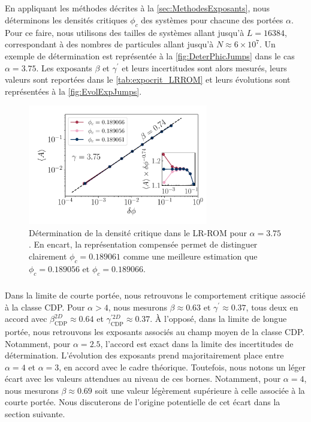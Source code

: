 \subparagraph{}En appliquant les méthodes décrites à la \autoref{sec:MethodesExposants}, nous déterminons les densités critiques $\phi_c$ des systèmes pour chacune des portées $\alpha$. Pour ce faire, nous utilisons des tailles de systèmes allant jusqu'à $L=16384$, correspondant à des nombres de particules allant jusqu'à $N\approx 6\times 10^7$. Un exemple de détermination est représentée à la \autoref{fig:DeterPhicJumps} dans le cas $\alpha = 3.75$. Les exposants $\beta$ et $\gamma^\prime$ et leurs incertitudes sont alors mesurés, leurs valeurs sont reportées dans le \autoref{tab:expocrit_LRROM} et leurs évolutions sont représentées à la \autoref{fig:EvolExpJumps}.

\begin{figure}[h]
	\centering
	\includegraphics[width=0.7\textwidth]{Chapitre2/Figures/Exposants/Deter_phic_gamma375_LRROM.pdf}
	\caption{Détermination de la densité critique dans le LR-ROM pour $\alpha=3.75$. En encart, la représentation compensée permet de distinguer clairement $\phi_c = 0.189061$ comme une meilleure estimation que $\phi_c = 0.189056$ et $\phi_c = 0.189066$. }
	\label{fig:DeterPhicJumps}
\end{figure}

\subparagraph{}Dans la limite de courte portée, nous retrouvons le comportement critique associé à la classe CDP. Pour $\alpha > 4$, nous mesurons $\beta\approx 0.63$ et $\gamma^\prime \approx 0.37$, tous deux en accord avec $\beta_\text{CDP}^{2D}\approx 0.64$ et $\gamma_\text{CDP}^{\prime 2D}\approx 0.37$. \`A l'opposé, dans la limite de longue portée, nous retrouvons les exposants associés au champ moyen de la classe CDP. Notamment, pour $\alpha = 2.5$, l'accord est exact dans la limite des incertitudes de détermination. L'évolution des exposants prend majoritairement place entre $\alpha = 4$ et $\alpha = 3$, en accord avec le cadre théorique. Toutefois, nous notons un léger écart avec les valeurs attendues au niveau de ces bornes. Notamment, pour $\alpha = 4$, nous mesurons $\beta \approx 0.69$ soit une valeur légèrement supérieure à celle associée à la courte portée. Nous discuterons de l'origine potentielle de cet écart dans la section suivante.

